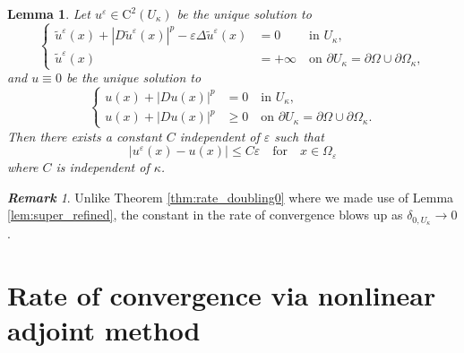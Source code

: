 \documentclass[11pt,reqno]{amsart}
\numberwithin{figure}{section}
\theoremstyle{plain}
\newtheorem{lem}[thm]{Lemma}
\theoremstyle{remark}
\newtheorem{rem}{\bf{Remark}}
\numberwithin{equation}{section}
\begin{document}
\begin{lem} Let $u^\varepsilon\in \mathrm{C}^2(U_\kappa)$ be the unique solution to 
\begin{equation*}
    \left\{
        \begin{aligned}
            \tilde{u}^\varepsilon(x) + |D\tilde{u}^\varepsilon(x)|^p-\varepsilon \Delta \tilde{u}^\varepsilon(x) &=0 \;\qquad \text{in } U_\kappa ,\\
            \tilde{u}^\varepsilon(x) &= +\infty \quad \text{on } \partial U_\kappa = \partial \Omega\cup \partial \Omega_{\kappa},
        \end{aligned}
    \right.
\end{equation*}
and $u \equiv 0 $ be the unique solution to 
\begin{equation*}
    \left\{
        \begin{aligned}
            u(x)+ |Du(x)|^p &=0 \quad \text{in } U_\kappa ,\\
            u(x)+ |Du(x)|^p &\geq 0 \quad \text{on } \partial U_\kappa = \partial \Omega \cup\partial \Omega_{\kappa}.
        \end{aligned}
    \right.
\end{equation*}
Then there exists a constant $C$ independent of $\varepsilon$ such that
\begin{equation*}
  |u^\varepsilon(x) - u(x)| \leq C\varepsilon \quad  \text{for} \quad x\in \Omega_{\varepsilon}
\end{equation*}
where $C$ is independent of $\kappa$.
\end{lem}
\begin{rem} Unlike Theorem \ref{thm:rate_doubling0} where we made use of Lemma \ref{lem:super_refined}, the constant in the rate of convergence blows up as $\delta_{0,U_\kappa} \to 0$.
\end{rem}


\clearpage


\section{Rate of convergence via nonlinear adjoint method}
\end{document}

